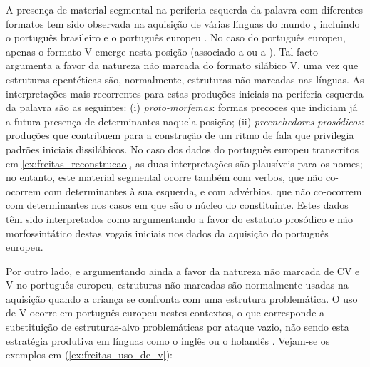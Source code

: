 \documentclass[output=paper]{LSP/langsci}
\begin{document}
A presença de material segmental na periferia esquerda da palavra com diferentes formatos tem sido observada na aquisição de várias línguas do mundo \citep{peters2001}, incluindo o português brasileiro \citep{scarpa1999} e o português europeu \citep{freitas1997}. No caso do português europeu, apenas o formato V emerge nesta posição (associado a \textipa{[5]} ou a \textipa{[1]}). Tal facto argumenta a favor da natureza não marcada do formato silábico V, uma vez que estruturas epentéticas são, normalmente, estruturas não marcadas nas línguas. As interpretações mais recorrentes para estas produções iniciais na periferia esquerda da palavra são as seguintes: (i) \textit{proto-morfemas}: formas precoces que indiciam já a futura presença de determinantes naquela posição; (ii) \textit{preenchedores prosódicos}: produções que contribuem para a construção de um ritmo de fala que privilegia padrões iniciais dissilábicos. No caso dos dados do português europeu transcritos em \ref{ex:freitas_reconstrucao}, as duas interpretações são plausíveis para os nomes; no entanto, este material segmental ocorre também com verbos, que não co-ocorrem com determinantes à sua esquerda, e com advérbios, que não co-ocorrem com determinantes nos casos em que são o núcleo do constituinte. Estes dados têm sido interpretados como argumentando a favor do estatuto prosódico e não morfossintático destas vogais iniciais nos dados da aquisição do português europeu. 

Por outro lado, e argumentando ainda a favor da natureza não marcada de CV e V no português europeu, estruturas não marcadas são normalmente usadas na aquisição quando a criança se confronta com uma estrutura problemática. O uso de V ocorre em português europeu nestes contextos, o que corresponde a substituição de estruturas-alvo problemáticas por ataque vazio, não sendo esta estratégia produtiva em línguas como o inglês ou o holandês \citep{fikkert1994,bernhardtstemberger1998}. Vejam-se os exemplos em (\ref{ex:freitas_uso_de_v}):
\end{document}
